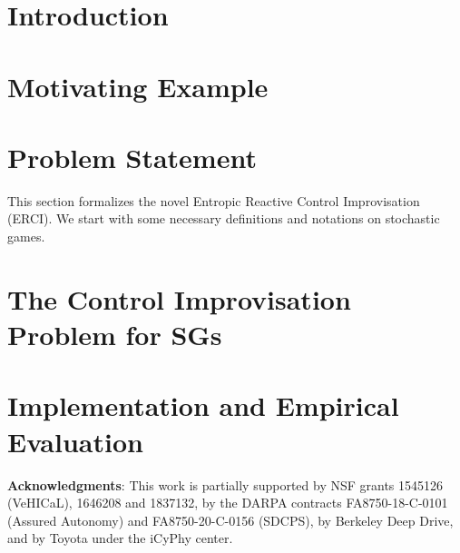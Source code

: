 \documentclass[conference]{IEEEtran}
\theoremstyle{remark}
\newcommand{\sg}{\mathcal{G}}
\newcommand{\eventually}[1]{\lozenge^{\leq #1}}
\newcommand{\sched}{\sigma}
\begin{document}
\section{Introduction}

\section{Motivating Example}
\label{sec:motivating}


\section{Problem Statement}
\label{sec:problem}
This section formalizes the novel Entropic Reactive Control Improvisation (ERCI).  We start with some necessary definitions and notations on stochastic games.








 
\section{The Control Improvisation Problem for SGs}\label{sec:sgs}

%


\section{Implementation and Empirical Evaluation}
\label{sec:empirical}





{\vspace{0.5em} 
  \noindent\textbf{Acknowledgments}:
This work is partially supported by NSF grants 1545126 (VeHICaL), 1646208 and 1837132, by the DARPA contracts FA8750-18-C-0101 (Assured Autonomy) and FA8750-20-C-0156 (SDCPS), by Berkeley Deep Drive, and by Toyota under the iCyPhy center.}







\end{document}
